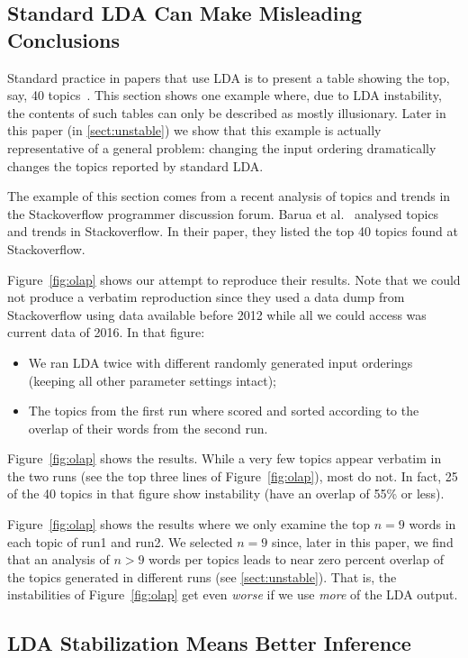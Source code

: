 \documentclass[twocolumn,5p,sort&compress]{elsarticle}
\newcommand{\tion}[1]{\ref{sect:#1}}
\newcommand{\fig}[1]{Figure~\ref{fig:#1}}
\newcommand{\bi}{\begin{itemize}}
\newcommand{\ei}{\end{itemize}}
\theoremstyle{break}
\begin{document}
\subsection{Standard LDA Can Make Misleading Conclusions}
Standard practice in papers that use LDA is to present a table showing the top, say, 40
topics~\cite{barua2014developers}.
This section shows one example where, due to LDA instability,
the contents of such tables can only be described as  mostly illusionary.
Later in this paper (in \tion{unstable}) we show that this example is actually representative of
a general problem: changing the input ordering dramatically changes the topics
reported by standard LDA.

The example of this section comes from a recent analysis
of topics and trends in the Stackoverflow programmer discussion forum.
Barua et al.~\cite{barua2014developers}
analysed topics and trends in Stackoverflow. In their paper,
they listed the top
40 topics found at Stackoverflow.

\fig{olap} shows our attempt to reproduce their results.
Note that we could not produce a verbatim reproduction since
they used a 
data dump from
Stackoverflow using data available before 2012 while all we could access was current data of 2016.
In that figure:
\bi
\item
  We ran LDA twice with different
randomly generated input orderings (keeping all other parameter settings intact);
\item
  The topics from the first run where scored and sorted
according to the overlap of their words
from the second run.
\ei
\fig{olap} shows the results.
While
a very few topics appear verbatim in the two runs (see the top three lines of \fig{olap}),
most do not. In fact,
25 of the 40 topics in that figure show  instability (have an overlap of 55\% or less).

\fig{olap} shows the results where we only
examine the top $n=9$ words in each topic of run1 and run2. We selected \mbox{$n=9$} since,
later in this paper, we find that an analysis of \mbox{$n>9$} words per topics leads to near
 zero percent overlap of the topics generated in different runs (see \tion{unstable}).
That is, the instabilities of \fig{olap} get even {\em worse} if we use {\em more} of the LDA output.

\subsection{LDA Stabilization Means Better Inference}
\end{document}
